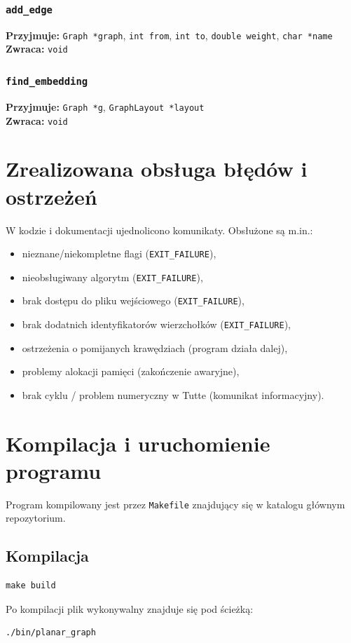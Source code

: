\documentclass[12pt]{article}
\begin{document}
\subsubsection{\texttt{add\_edge}}
\textbf{Przyjmuje:} \texttt{Graph *graph}, \texttt{int from}, \texttt{int to}, \texttt{double weight}, \texttt{char *name}\\
\textbf{Zwraca:} \texttt{void}

\subsubsection{\texttt{find\_embedding}}
\textbf{Przyjmuje:} \texttt{Graph *g}, \texttt{GraphLayout *layout}\\
\textbf{Zwraca:} \texttt{void}

\section{Zrealizowana obsługa błędów i ostrzeżeń}
W kodzie i dokumentacji ujednolicono komunikaty. Obsłużone są m.in.:
\begin{itemize}
	\item nieznane/niekompletne flagi (\texttt{EXIT\_FAILURE}),
	\item nieobsługiwany algorytm (\texttt{EXIT\_FAILURE}),
	\item brak dostępu do pliku wejściowego (\texttt{EXIT\_FAILURE}),
	\item brak dodatnich identyfikatorów wierzchołków (\texttt{EXIT\_FAILURE}),
	\item ostrzeżenia o pomijanych krawędziach (program działa dalej),
	\item problemy alokacji pamięci (zakończenie awaryjne),
	\item brak cyklu / problem numeryczny w Tutte (komunikat informacyjny).
\end{itemize}

\section{Kompilacja i uruchomienie programu}
Program kompilowany jest przez \texttt{Makefile} znajdujący się w katalogu głównym repozytorium.

\subsection{Kompilacja}
\begin{verbatim}
make build
\end{verbatim}
Po kompilacji plik wykonywalny znajduje się pod ścieżką:
\begin{verbatim}
./bin/planar_graph
\end{verbatim}
\end{document}
